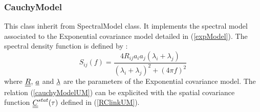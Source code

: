 \newpage
\subsubsection{CauchyModel}
\label{cauchyMod}

This class inherit from SpectralModel class. It implements the spectral model associated to the Exponential covariance model detailed in (\ref{expModel}). The spectral density function is defined by :
\begin{equation}\label{cauchyModelUM}
S_{ij}(f) = \displaystyle \frac{4R_{ij}a_ia_j(\lambda_i+ \lambda_j)}{(\lambda_i+ \lambda_j)^2 + (4\pi f)^2}
\end{equation}
where ${\underline{\underline{R}}}$, ${\underline{a}}$ and ${\underline{\lambda}}$ are the parameters of the Exponential covariance model. The relation (\ref{cauchyModelUM}) can be explicited with the spatial covariance function  ${\underline{\underline{C}}}^{stat}(\tau)$ defined in (\ref{RClinkUM}).


